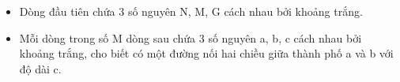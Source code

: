 \begin{itemize}
	\item     Dòng đầu tiên chứa 3 số nguyên N, M, G cách nhau bởi khoảng trắng.   
	\item     Mỗi dòng trong số M dòng sau chứa 3 số nguyên a, b, c cách nhau bởi khoảng trắng, cho biết có một đường nối hai chiều giữa thành phố a và b với độ dài c.   
\end{itemize}
